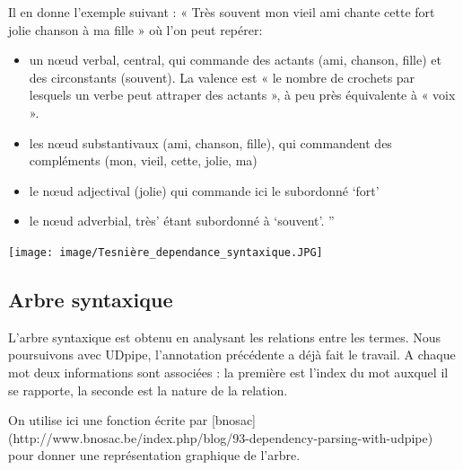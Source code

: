 \documentclass[
  letterpaper,
  DIV=11,
  numbers=noendperiod]{scrreprt}
\providecommand{\tightlist}{%
  \setlength{\itemsep}{0pt}\setlength{\parskip}{0pt}}\usepackage{longtable,booktabs,array}
\begin{document}
Il en donne l'exemple suivant : « Très souvent mon vieil ami chante
cette fort jolie chanson à ma fille » où l'on peut repérer:

\begin{itemize}
\tightlist
\item
  un nœud verbal, central, qui commande des actants (ami, chanson,
  fille) et des circonstants (souvent). La valence est « le nombre de
  crochets par lesquels un verbe peut attraper des actants », à peu près
  équivalente à « voix ».
\item
  les nœud substantivaux (ami, chanson, fille), qui commandent des
  compléments (mon, vieil, cette, jolie, ma)
\item
  le nœud adjectival (jolie) qui commande ici le subordonné `fort'
\item
  le nœud adverbial, très' étant subordonné à `souvent'. ''
\end{itemize}

\texttt{[image: image/Tesnière\_dependance\_syntaxique.JPG]}

\subsection{Arbre syntaxique}\label{arbre-syntaxique}

L'arbre syntaxique est obtenu en analysant les relations entre les
termes. Nous poursuivons avec UDpipe, l'annotation précédente a déjà
fait le travail. A chaque mot deux informations sont associées : la
première est l'index du mot auxquel il se rapporte, la seconde est la
nature de la relation.

On utilise ici une fonction écrite par
{[}bnosac{]}(http://www.bnosac.be/index.php/blog/93-dependency-parsing-with-udpipe)
pour donner une représentation graphique de l'arbre.
\end{document}
